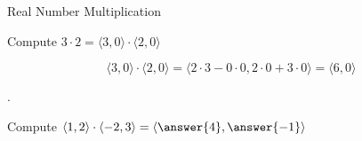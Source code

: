 \documentclass{ximera}
\begin{document}
\begin{example} Real Number Multiplication

Compute  $3 \cdot 2 = \langle 3, 0 \rangle  \cdot \langle 2, 0 \rangle$

\begin{explanation}


\[
\langle 3, 0 \rangle  \cdot \langle 2, 0 \rangle = \langle 2 \cdot 3 - 0 \cdot 0, 2 \cdot 0 + 3 \cdot 0 \rangle = \langle 6, 0 \rangle 
\]
\end{explanation}

\end{example}




\begin{question} .


Compute  $\langle 1, 2 \rangle  \cdot \langle -2, 3 \rangle = \left\langle \answer{4}, \answer{-1} \right\rangle $



\end{question}
\end{document}
